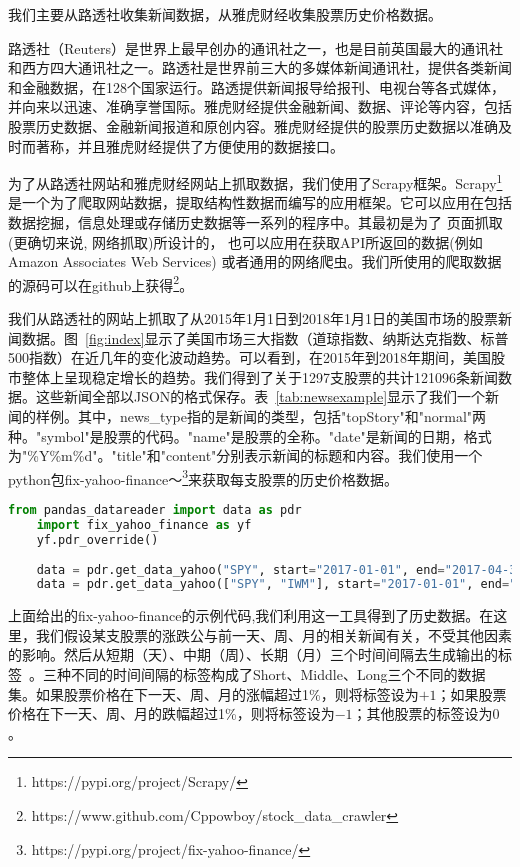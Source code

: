 我们主要从路透社收集新闻数据，从雅虎财经收集股票历史价格数据。

路透社（Reuters）是世界上最早创办的通讯社之一，也是目前英国最大的通讯社和西方四大通讯社之一。路透社是世界前三大的多媒体新闻通讯社，提供各类新闻和金融数据，在128个国家运行。路透提供新闻报导给报刊、电视台等各式媒体，并向来以迅速、准确享誉国际。雅虎财经提供金融新闻、数据、评论等内容，包括股票历史数据、金融新闻报道和原创内容。雅虎财经提供的股票历史数据以准确及时而著称，并且雅虎财经提供了方便使用的数据接口。

为了从路透社网站和雅虎财经网站上抓取数据，我们使用了Scrapy框架。Scrapy\footnote{https://pypi.org/project/Scrapy/}是一个为了爬取网站数据，提取结构性数据而编写的应用框架。它可以应用在包括数据挖掘，信息处理或存储历史数据等一系列的程序中。其最初是为了 页面抓取 (更确切来说, 网络抓取)所设计的， 也可以应用在获取API所返回的数据(例如 Amazon Associates Web Services) 或者通用的网络爬虫。我们所使用的爬取数据的源码可以在github上获得\footnote{https://www.github.com/Cppowboy/stock\_data\_crawler}。

我们从路透社的网站上抓取了从2015年1月1日到2018年1月1日的美国市场的股票新闻数据。图~\ref{fig:index}显示了美国市场三大指数（道琼指数、纳斯达克指数、标普500指数）在近几年的变化波动趋势。可以看到，在2015年到2018年期间，美国股市整体上呈现稳定增长的趋势。我们得到了关于1297支股票的共计121096条新闻数据。这些新闻全部以JSON的格式保存。表~\ref{tab:newsexample}显示了我们一个新闻的样例。其中，news\_type指的是新闻的类型，包括"topStory"和"normal"两种。"symbol"是股票的代码。"name"是股票的全称。"date"是新闻的日期，格式为"\%Y\%m\%d"。"title"和"content"分别表示新闻的标题和内容。我们使用一个python包fix-yahoo-finance〜\footnote{https://pypi.org/project/fix-yahoo-finance/}来获取每支股票的历史价格数据。

\begin{lstlisting}[language={Python}]
	from pandas_datareader import data as pdr
	import fix_yahoo_finance as yf
	yf.pdr_override() 
	
	data = pdr.get_data_yahoo("SPY", start="2017-01-01", end="2017-04-30")
	data = pdr.get_data_yahoo(["SPY", "IWM"], start="2017-01-01", end="2017-04-30")
	\end{lstlisting}

上面给出的fix-yahoo-finance的示例代码,我们利用这一工具得到了历史数据。在这里，我们假设某支股票的涨跌公与前一天、周、月的相关新闻有关，不受其他因素的影响。然后从短期（天）、中期（周）、长期（月）三个时间间隔去生成输出的标签~\cite{ding2014using}。三种不同的时间间隔的标签构成了Short、Middle、Long三个不同的数据集。如果股票价格在下一天、周、月的涨幅超过1\%，则将标签设为$+1$；如果股票价格在下一天、周、月的跌幅超过1\%，则将标签设为$-1$；其他股票的标签设为$0$。

